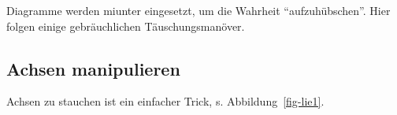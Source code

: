 \documentclass[
  letterpaper,
]{scrbook}
\theoremstyle{definition}
\theoremstyle{definition}
\theoremstyle{definition}
\theoremstyle{remark}
\begin{document}
Diagramme werden miunter eingesetzt, um die Wahrheit ``aufzuhübschen''.
Hier folgen einige gebräuchlichen Täuschungsmanöver.

\subsection{Achsen manipulieren}\label{achsen-manipulieren}

Achsen zu stauchen ist ein einfacher Trick, s. Abbildung~\ref{fig-lie1}.

\begin{figure}

\begin{minipage}{0.50\linewidth}

\end{minipage}
\end{figure}
\end{document}
